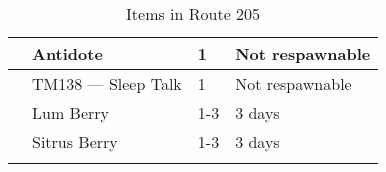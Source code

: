 \begin{longtable}{|| l l l l ||}%
\hline%
&Antidote&1&Not respawnable\\%
\hline%
&TM138 — Sleep Talk&1&Not respawnable\\%
\hline%
&Lum Berry&1{-}3&3 days\\%
\hline%
&Sitrus Berry&1{-}3&3 days\\%
\hline%
\endhead%
\hline%
\caption{Items in Route 205}%
\label{tab:Route205Items}%
\end{longtable}